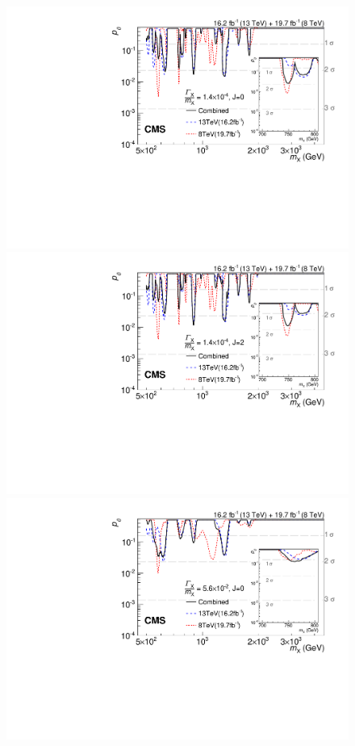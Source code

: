 \begin{figure}[htb]
    \centering
    \includegraphics[width=\cmsFigWidth]{Figure_007-a.pdf}
    \includegraphics[width=\cmsFigWidth]{Figure_007-b.pdf}  \\[0.5ex]
    \includegraphics[width=\cmsFigWidth]{Figure_007-c.pdf}

\end{figure}

